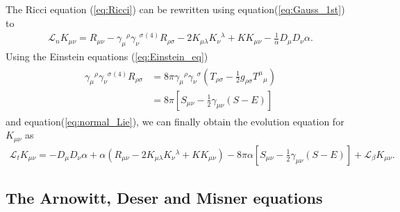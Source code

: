 The Ricci equation (\ref{eq:Ricci}) can be rewritten using equation(\ref{eq:Gauss_1st}) to
\begin{align}
    \mathcal{L}_n K_{\mu\nu} = R_{\mu\nu} - \gamma_{\mu}{}^{\rho} \gamma_\nu{}^{\sigma} {}^{(4)} R_{\rho\sigma} - 2 K_{\mu\lambda} K_\nu{}^{\lambda} + K K_{\mu\nu} - \frac{1}{\alpha} D_\mu D_\nu \alpha.
\end{align}
Using the Einstein equations (\ref{eq:Einstein_eq})
\begin{align}
\begin{split}
    \gamma_{\mu}{}^{\rho} \gamma_\nu{}^{\sigma} {}^{(4)} R_{\rho\sigma} &= 8\pi \gamma_{\mu}{}^{\rho} \gamma_\nu{}^{\sigma} \left( T_{\rho\sigma} - \frac{1}{2}g_{\rho\sigma} T^\mu{}_\mu \right)\\
    &= 8\pi \left[S_{\mu\nu} - \frac{1}{2} \gamma_{\mu\nu} \left(S-E\right) \right]
\end{split}
\end{align}
and equation(\ref{eq:normal_Lie}), we can finally obtain the evolution equation for $K_{\mu\nu}$ as
\begin{align}\label{eq:K_evol}
    \mathcal{L}_t K_{\mu\nu} = - D_\mu D_\nu \alpha + \alpha \left(R_{\mu\nu} - 2K_{\mu\lambda} K_\nu{}^{\lambda} + K K_{\mu\nu} \right) 
    - 8 \pi \alpha \left[ S_{\mu\nu} - \frac{1}{2}\gamma_{\mu\nu} \left(S-E\right) \right] + \mathcal{L}_\beta K_{\mu\nu}.
\end{align}

\subsection{The Arnowitt, Deser and Misner equations} %
\label{section2.2.6}


